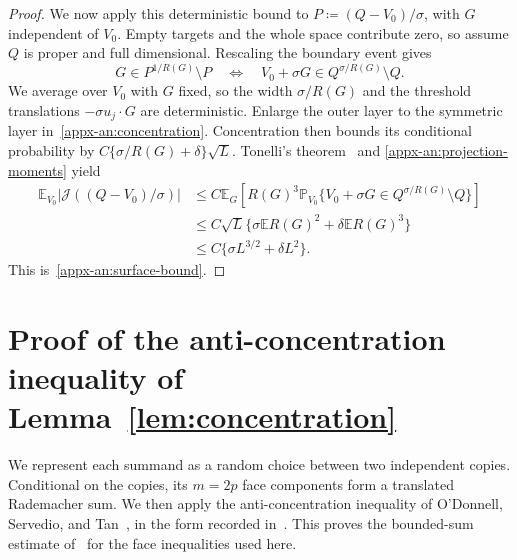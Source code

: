 \documentclass[11pt,letterpaper]{article}
\theoremstyle{remark}
\newcommand{\E}{\mathbb E}
\newcommand{\Pp}{\mathbb P}
\newcommand{\surf}{\mathcal J}
\begin{document}
\begin{proof}
We now apply this deterministic bound to \(P\coloneqq (Q-V_0)/\sigma\),
with \(G\) independent of \(V_0\). Empty targets and the whole space
contribute zero, so assume \(Q\) is proper and full dimensional.
Rescaling the boundary event gives
\[
 G\in P^{1/R(G)}\setminus P
 \quad\Longleftrightarrow\quad
 V_0+\sigma G\in Q^{\sigma/R(G)}\setminus Q.
\]
We average over \(V_0\) with \(G\) fixed, so the width
\(\sigma/R(G)\) and the threshold translations
\(-\sigma u_j\cdot G\) are deterministic. Enlarge the outer layer
to the symmetric layer in~\eqref{appx-an:concentration}. Concentration then
bounds its conditional probability by
\(C\{\sigma/R(G)+\delta\}\sqrt L\). Tonelli's
theorem~\cite[Section~2.5]{Folland1999} and
\eqref{appx-an:projection-moments} yield
\begin{align*}
 \E_{V_0}|\surf((Q-V_0)/\sigma)|
 &\le C\E_G\left[R(G)^3
       \Pp_{V_0}\{V_0+\sigma G\in Q^{\sigma/R(G)}\setminus Q\}\right]\\
 &\le C\sqrt L\{\sigma\E R(G)^2+\delta\E R(G)^3\}\\
 &\le C\{\sigma L^{3/2}+\delta L^2\}.
\end{align*}
This is~\eqref{appx-an:surface-bound}.
\end{proof}

\section{\texorpdfstring{Proof of the anti-concentration inequality of Lemma~\ref{lem:concentration}}{Proof of the anti-concentration inequality of Lemma 1}}\label{appx-app:concentration}
\label{appx-conc:conditioning}

We represent each summand as a random choice between two independent
copies. Conditional on the copies, its \(m=2p\) face components
form a translated Rademacher sum. We then apply the anti-concentration
inequality of O'Donnell, Servedio, and Tan~\cite{OST}, in the form
recorded in~\cite[Lemma~J.4]{CCKK2022}. This proves the bounded-sum
estimate of~\cite[Lemma~2.1]{AL} for the face inequalities used here.
\end{document}
